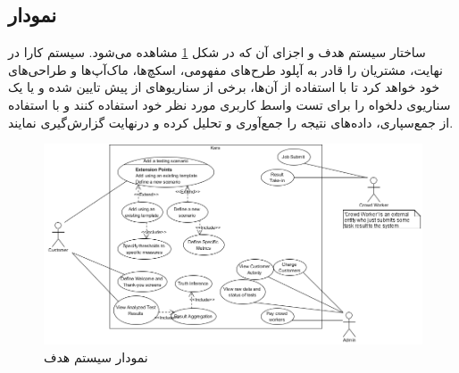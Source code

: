\documentclass{article}
\theoremstyle{definition}
\begin{document}
\subsection{نمودار }
ساختار سیستم هدف و اجزای آن که در شکل 
\ref{usecase}
مشاهده می‌شود.
سیستم کارا در نهایت، مشتریان را قادر به آپلود طرح‌های مفهومی، اسکچ‌ها، ماک‌آپ‌ها و طراحی‌های خود خواهد کرد تا با استفاده از آن‌ها، برخی از سناریوهای از پیش تایین شده و یا یک سناریوی دلخواه را برای تست واسط کاربری مورد نظر خود استفاده کنند و با استفاده از جمع‌سپاری، داده‌های نتیجه را جمع‌آوری و تحلیل کرده و درنهایت گزارش‌گیری نمایند.
\begin{figure}[H]
	\centering \includegraphics[width=\linewidth]{Resources/UseCase.png}
	\caption{نمودار  سیستم هدف}
	\label{usecase}
\end{figure}
\end{document}
